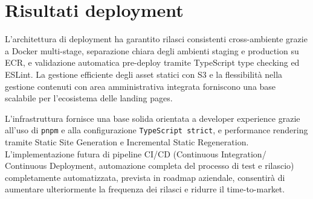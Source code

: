 \section{Risultati deployment}

L'architettura di deployment ha garantito rilasci consistenti cross-ambiente grazie 
a Docker multi-stage, separazione chiara degli ambienti staging e production su ECR, 
e validazione automatica pre-deploy tramite TypeScript type checking ed ESLint. 
La gestione efficiente degli asset statici con S3 e la flessibilità nella gestione 
contenuti con area amministrativa integrata forniscono una base scalabile 
per l'ecosistema delle landing pages.

\bigskip
L'infrastruttura fornisce una base solida orientata a developer experience 
grazie all'uso di \texttt{pnpm} e alla configurazione \texttt{TypeScript strict}, 
e performance rendering tramite Static Site Generation e Incremental Static 
Regeneration. L'implementazione futura di pipeline CI/CD (Continuous Integration/
Continuous Deployment, automazione completa del processo di test e rilascio) 
completamente automatizzata, prevista in roadmap aziendale, consentirà di 
aumentare ulteriormente la frequenza dei rilasci e ridurre il time-to-market.